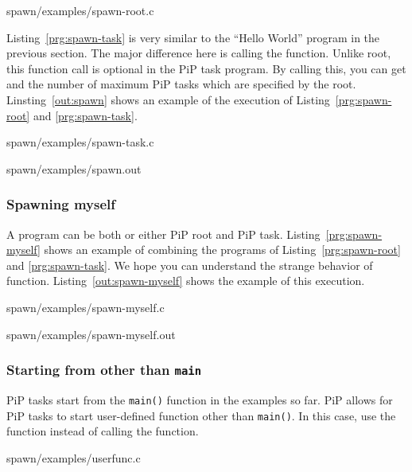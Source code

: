  {spawn/examples/spawn-root.c}

Listing~\ref{prg:spawn-task} is very similar to the ``Hello World''
program in the previous section. The major difference here is calling
the  function. Unlike root, this function call is
optional in the PiP task program. By calling this, you can get 
{\PIPID} and the number of maximum PiP tasks which are specified by the
root. Linsting~\ref{out:spawn} shows an example of the execution of
Listing~\ref{prg:spawn-root} and \ref{prg:spawn-task}. 


                {spawn/examples/spawn-task.c}


                {spawn/examples/spawn.out}

\subsubsection{Spawning myself}

A program can be both or either PiP root and PiP
task. Listing~\ref{prg:spawn-myself} shows an example of combining the
programs of Listing~\ref{prg:spawn-root} and \ref{prg:spawn-task}. We
hope you can understand the strange behavior of 
function. Listing~\ref{out:spawn-myself} shows the example of this
execution. 


                {spawn/examples/spawn-myself.c}


                {spawn/examples/spawn-myself.out}

\subsubsection{Starting from other than {\tt main}}

PiP tasks start from the {\tt main()} function in the examples so
far. PiP allows for PiP tasks to start user-defined function other
than {\tt main()}. In this case, use the 
function instead of calling the  function.


                {spawn/examples/userfunc.c}

